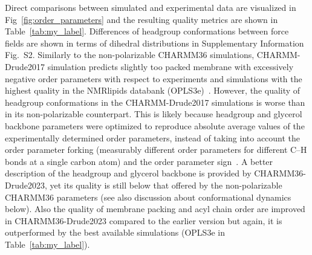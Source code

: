 \documentclass[journal=jctcce,manuscript=article,layout=singlecolumn]{achemso}
\begin{document}
Direct comparisons between simulated and experimental data are visualized in Fig~\ref{fig:order_parameters} and the resulting quality metrics are shown in Table~\ref{tab:my_label}. Differences of headgroup conformations between force fields are shown in terms of dihedral distributions in Supplementary Information Fig.~S2. Similarly to the non-polarizable CHARMM36 simulations, CHARMM-Drude2017 simulation predicts slightly too packed membrane with excessively negative order parameters with respect to experiments and simulations with the highest quality in the NMRlipids databank (OPLS3e)~\cite{Databank}. However,
the quality of headgroup conformations in the CHARMM-Drude2017 simulations is worse than in its non-polarizable counterpart. This is likely because headgroup and glycerol backbone parameters were optimized to reproduce absolute average values of the experimentally determined order parameters, instead of taking into account the order parameter forking (measurably different order parameters for different C--H bonds at a single carbon atom) and the order parameter sign~\cite{Antila2022}. A better description of the headgroup and glycerol backbone is provided by CHARMM36-Drude2023, yet its quality is still below that offered by the non-polarizable CHARMM36 parameters (see also discussion about conformational dynamics below). Also the quality of membrane packing and acyl chain order are improved in CHARMM36-Drude2023 compared to the earlier version but again, it is outperformed by the best available simulations (OPLS3e in Table~\ref{tab:my_label}).
\end{document}

